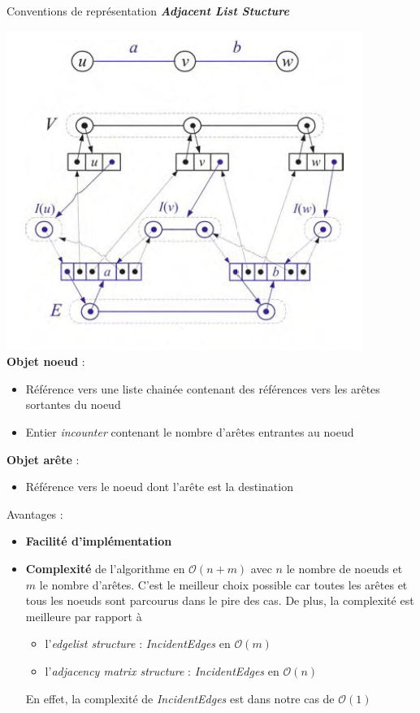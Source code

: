 \begin{frame}[allowframebreaks]{Conventions de représentation}
\textbf{\textit{Adjacent List Stucture}}\\
\begin{multicols}{2}
\includegraphics[scale=0.35]{images/schema.jpg}\\
\textbf{Objet noeud} : \begin{itemize}
\item Référence vers une liste chainée contenant des références vers les arêtes sortantes du noeud
\item Entier \textit{incounter} contenant le nombre d'arêtes entrantes au noeud\\
\end{itemize}

\textbf{Objet arête} : \begin{itemize}
\item Référence vers le noeud dont l'arête est la destination
\end{itemize}
\end{multicols}

\newpage
Avantages : \\
\begin{itemize}
\item \textbf{Facilité d'implémentation}
\item \textbf{Complexité} de l'algorithme en $\mathcal{O}(n+m)$ avec $n$ le nombre de noeuds et $m$ le nombre d'arêtes. C'est le meilleur choix possible car toutes les arêtes et tous les noeuds sont parcourus dans le pire des cas. De plus, la complexité est meilleure par rapport à
\begin{itemize}
\item l'\textit{edgelist structure} : \textit{IncidentEdges} en $\mathcal{O}(m)$
\item l'\textit{adjacency matrix structure} : \textit{IncidentEdges} en $\mathcal{O}(n)$
\end{itemize}
En effet, la complexité de \textit{IncidentEdges} est dans notre cas de $\mathcal{O}(1)$
\end{itemize}
\end{frame}
